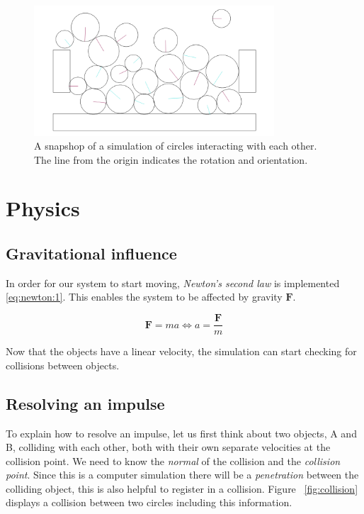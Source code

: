 \documentclass[a4paper,12pt]{report}
\begin{document}
\begin{figure}[!ht]
    \centering
    \includegraphics[width=0.8\textwidth]{figures/snapshot.png}
    \caption{A snapshop of a simulation of circles interacting with each other. The line from the origin indicates the rotation and orientation.}
    \label{fig:snapshot}
\end{figure}


\chapter{Physics}

\section{Gravitational influence}

In order for our system to start moving, \emph{Newton's second law} is implemented  \ref{eq:newton:1}. This enables the system to be affected by gravity $\mathbf F$.

\begin{equation}
\mathbf F=ma\Leftrightarrow a=\dfrac{\mathbf F}{m}
\label{eq:newton:1}
\end{equation}

Now that the objects have a linear velocity, the simulation can start checking for collisions between objects.

\section{Resolving an impulse}

To explain how to resolve an impulse\cite{gdm}, let us first think about two objects, A and B, colliding with each other, both with their own separate velocities at the collision point. We need to know the \emph{normal} of the collision and the \emph{collision point}. Since this is a computer simulation there will be a \emph{penetration} between the colliding object, this is also helpful to register in a collision. Figure ~\ref{fig:collision} displays a collision between two circles including this information.
\end{document}
